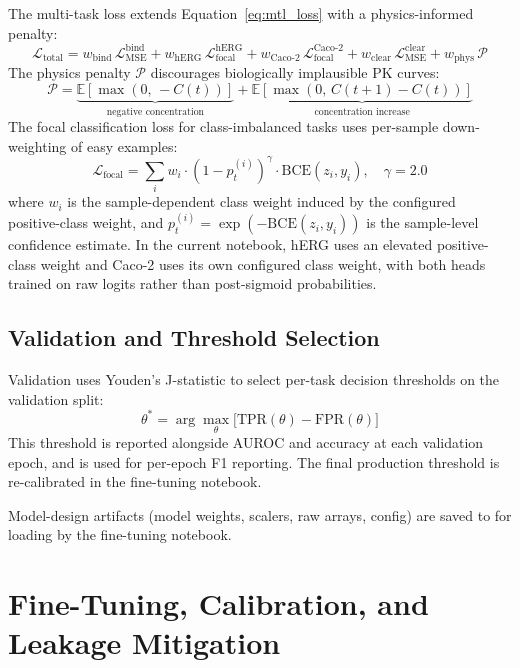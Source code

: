 \documentclass[a4paper,11pt,twoside]{report}
\begin{document}
The multi-task loss extends Equation~\ref{eq:mtl_loss} with a physics-informed penalty:
\begin{equation}
\mathcal{L}_{\text{total}} = w_{\text{bind}}\,\mathcal{L}_{\text{MSE}}^{\text{bind}} + w_{\text{hERG}}\,\mathcal{L}_{\text{focal}}^{\text{hERG}} + w_{\text{Caco-2}}\,\mathcal{L}_{\text{focal}}^{\text{Caco-2}} + w_{\text{clear}}\,\mathcal{L}_{\text{MSE}}^{\text{clear}} + w_{\text{phys}}\,\mathcal{P}
\label{eq:phase3b_loss}
\end{equation}
The physics penalty $\mathcal{P}$ discourages biologically implausible PK curves:
\begin{equation}
\mathcal{P} = \underbrace{\mathbb{E}[\max(0,\,-C(t))]}_{\text{negative concentration}} + \underbrace{\mathbb{E}[\max(0,\,C(t+1)-C(t))]}_{\text{concentration increase}}
\end{equation}
The focal classification loss for class-imbalanced tasks uses per-sample down-weighting of easy examples:
\begin{equation}
\mathcal{L}_{\text{focal}} = \sum_i w_i \cdot (1 - p_t^{(i)})^\gamma \cdot \text{BCE}(z_i, y_i), \quad \gamma = 2.0
\end{equation}
where $w_i$ is the sample-dependent class weight induced by the configured positive-class weight, and $p_t^{(i)} = \exp(-\text{BCE}(z_i, y_i))$ is the sample-level confidence estimate. In the current notebook, hERG uses an elevated positive-class weight and Caco-2 uses its own configured class weight, with both heads trained on raw logits rather than post-sigmoid probabilities.

\subsection{Validation and Threshold Selection}

Validation uses Youden's J-statistic to select per-task decision thresholds on the validation split:
\[
  \theta^* = \arg\max_{\theta}\bigl[\text{TPR}(\theta) - \text{FPR}(\theta)\bigr]
\]
This threshold is reported alongside AUROC and accuracy at each validation epoch, and is used for per-epoch F1 reporting. The final production threshold is re-calibrated in the fine-tuning notebook.

Model-design artifacts (model weights, scalers, raw arrays, config) are saved to  for loading by the fine-tuning notebook.


\section{Fine-Tuning, Calibration, and Leakage Mitigation}
\label{sec:finetuning}
\end{document}

